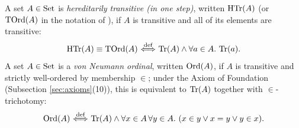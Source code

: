 \documentclass[10pt,a4paper]{article}
\begin{document}
\begin{definition}\label{def:htr_ord}
A set $A \in {\textrm{Set}}$ is \emph{hereditarily transitive (in one step)}, written ${\textrm{HTr}}(A)$ (or ${\textrm{TOrd}}(A)$ in the notation of \cite[Def.~7.12]{TakeutiZaring1982}), if $A$ is transitive and all of its elements are transitive:
$${\textrm{HTr}}(A) \equiv {\textrm{TOrd}}(A) {\stackrel{{\textrm{def}}}{\ \Longleftrightarrow\ }} {\textrm{Tr}}(A)\land \forall a\in A.\ {\textrm{Tr}}(a).$$
A set $A \in {\textrm{Set}}$ is a \emph{von Neumann ordinal}, written ${\textrm{Ord}}(A)$, if $A$ is transitive and strictly well-ordered by membership $\in$; under the Axiom of Foundation (Subsection \ref{sec:axioms}(10)), this is equivalent to ${\textrm{Tr}}(A)$ together with $\in$-trichotomy:
$${\textrm{Ord}}(A) {\stackrel{{\textrm{def}}}{\ \Longleftrightarrow\ }} {\textrm{Tr}}(A) \land \forall x \in A\, \forall y \in A.\ (x \in y \lor x = y \lor y \in x).$$
\end{definition}
\end{document}
